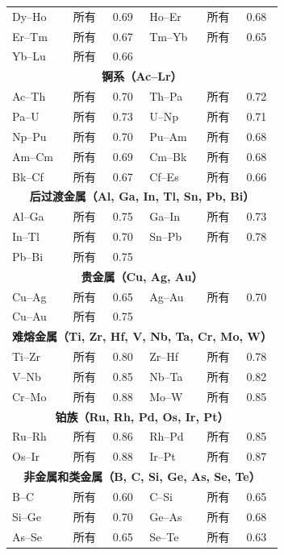 \documentclass[12pt,a4paper]{article}
\begin{document}
\begin{longtable}{p{2.5cm} p{2.5cm} p{1.2cm} p{2.5cm} p{2.5cm} p{1.2cm}}
		Dy–Ho & 所有 & 0.69 & Ho–Er & 所有 & 0.68 \\
		Er–Tm & 所有 & 0.67 & Tm–Yb & 所有 & 0.65 \\
		Yb–Lu & 所有 & 0.66 & & & \\
		\multicolumn{6}{c}{\textbf{锕系（Ac–Lr）}} \\
		Ac–Th & 所有 & 0.70 & Th–Pa & 所有 & 0.72 \\
		Pa–U  & 所有 & 0.73 & U–Np & 所有 & 0.71 \\
		Np–Pu & 所有 & 0.70 & Pu–Am & 所有 & 0.68 \\
		Am–Cm & 所有 & 0.69 & Cm–Bk & 所有 & 0.68 \\
		Bk–Cf & 所有 & 0.67 & Cf–Es & 所有 & 0.66 \\
		\multicolumn{6}{c}{\textbf{后过渡金属（Al, Ga, In, Tl, Sn, Pb, Bi）}} \\
		Al–Ga & 所有 & 0.75 & Ga–In & 所有 & 0.73 \\
		In–Tl & 所有 & 0.70 & Sn–Pb & 所有 & 0.78 \\
		Pb–Bi & 所有 & 0.75 & & & \\
		\multicolumn{6}{c}{\textbf{贵金属（Cu, Ag, Au）}} \\
		Cu–Ag & 所有 & 0.65 & Ag–Au & 所有 & 0.70 \\
		Cu–Au & 所有 & 0.75 & & & \\
		\multicolumn{6}{c}{\textbf{难熔金属（Ti, Zr, Hf, V, Nb, Ta, Cr, Mo, W）}} \\
		Ti–Zr & 所有 & 0.80 & Zr–Hf & 所有 & 0.78 \\
		V–Nb & 所有 & 0.85 & Nb–Ta & 所有 & 0.82 \\
		Cr–Mo & 所有 & 0.88 & Mo–W & 所有 & 0.85 \\
		\multicolumn{6}{c}{\textbf{铂族（Ru, Rh, Pd, Os, Ir, Pt）}} \\
		Ru–Rh & 所有 & 0.86 & Rh–Pd & 所有 & 0.85 \\
		Os–Ir & 所有 & 0.88 & Ir–Pt & 所有 & 0.87 \\
		\multicolumn{6}{c}{\textbf{非金属和类金属（B, C, Si, Ge, As, Se, Te）}} \\
		B–C  & 所有 & 0.60 & C–Si  & 所有 & 0.65 \\
		Si–Ge & 所有 & 0.70 & Ge–As & 所有 & 0.68 \\
		As–Se & 所有 & 0.65 & Se–Te & 所有 & 0.63 \\
		\bottomrule
	\end{longtable}
	
\end{document}
